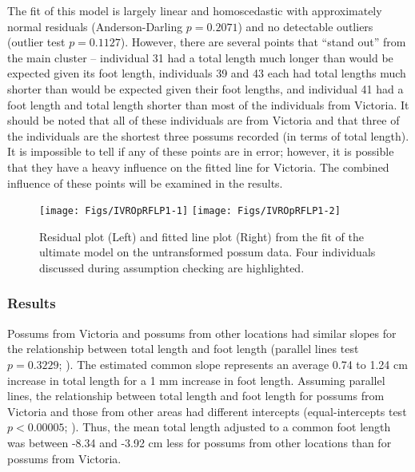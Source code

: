 \documentclass[10pt,openany]{book}\usepackage[]{graphicx}\usepackage[]{color}
\newenvironment{knitrout}{}{} %
\begin{document}
The fit of this model is largely linear and homoscedastic  with approximately normal residuals (Anderson-Darling $p=0.2071$) and no detectable outliers (outlier test $p=0.1127$).  However, there are several points that ``stand out'' from the main cluster  -- individual 31 had a total length much longer than would be expected given its foot length, individuals 39 and 43 each had total lengths much shorter than would be expected given their foot lengths, and individual 41 had a foot length and total length shorter than most of the individuals from Victoria.  It should be noted that all of these individuals are from Victoria and that three of the individuals are the shortest three possums recorded (in terms of total length).  It is impossible to tell if any of these points are in error; however, it is possible that they have a heavy influence on the fitted line for Victoria.  The combined influence of these points will be examined in the results.

\begin{knitrout}
\color{fgcolor}\begin{figure}[h]

{\centering \texttt{[image: Figs/IVROpRFLP1-1]} 
\texttt{[image: Figs/IVROpRFLP1-2]} 

}

\caption[Residual plot (Left) and fitted line plot (Right) from the fit of the ultimate model on the untransformed possum data]{Residual plot (Left) and fitted line plot (Right) from the fit of the ultimate model on the untransformed possum data.  Four individuals discussed during assumption checking are highlighted.}\label{fig:IVROpRFLP1}
\end{figure}


\end{knitrout}

\subsubsection*{Results}

Possums from Victoria and possums from other locations had similar slopes for the relationship between total length and foot length (parallel lines test $p=0.3229$; ).  The estimated common slope represents an average 0.74 to 1.24 cm increase in total length for a 1 mm increase in foot length.  Assuming parallel lines, the relationship between total length and foot length for possums from Victoria and those from other areas had different intercepts (equal-intercepts test $p<0.00005$; ).  Thus, the mean total length adjusted to a common foot length was between -8.34 and -3.92 cm less for possums from other locations than for possums from Victoria.
\end{document}
